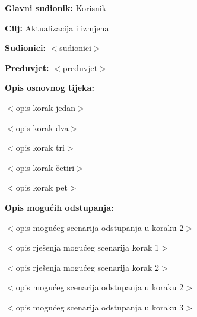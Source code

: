 		
			\noindent {}
			\begin{packed_item}
				
				\item \textbf{Glavni sudionik: }Korisnik
				\item  \textbf{Cilj:} Aktualizacija i izmjena 
				\item  \textbf{Sudionici:} $<$sudionici$>$
				\item  \textbf{Preduvjet:} $<$preduvjet$>$
				\item  \textbf{Opis osnovnog tijeka:}
				
				\item[] \begin{packed_enum}
					
					\item $<$opis korak jedan$>$
					\item $<$opis korak dva$>$
					\item $<$opis korak tri$>$
					\item $<$opis korak četiri$>$
					\item $<$opis korak pet$>$
				\end{packed_enum}
				
				\item  \textbf{Opis mogućih odstupanja:}
				
				\item[] \begin{packed_item}
					
					\item[2.a] $<$opis mogućeg scenarija odstupanja u koraku 2$>$
					\item[] \begin{packed_enum}
						
						\item $<$opis rješenja mogućeg scenarija korak 1$>$
						\item $<$opis rješenja mogućeg scenarija korak 2$>$
						
					\end{packed_enum}
					\item[2.b] $<$opis mogućeg scenarija odstupanja u koraku 2$>$
					\item[3.a] $<$opis mogućeg scenarija odstupanja  u koraku 3$>$
					
				\end{packed_item}
			\end{packed_item}
		
			
			
